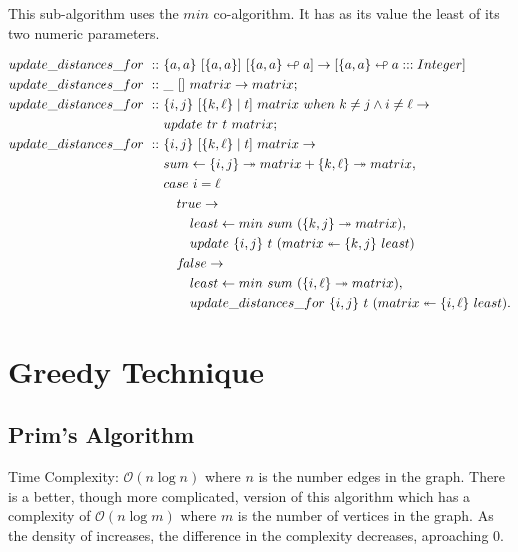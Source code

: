 \documentclass[a4paper,10pt]{book}
\newcommand\when{\  when\ }
\newcommand{\false}{f\kern-0.25ex{alse}}
\begin{document}
This sub-algorithm uses the $min$ co-algorithm. It has as its value the least of its two numeric parameters.

\begin{align*}
update\_distances\_for\ ::\ &\{a,a\}\ [\{a,a\}]\ [\{a,a\}\looparrowleft a]\rightarrow [\{a,a\}\looparrowleft a:::Integer]\\
update\_distances\_for\ ::\ &\_\ []\ matrix\rightarrow matrix;\\
update\_distances\_for\ ::\ &\{i,j\}\ [\{k,\ell\}\mid t]\ matrix\when k \ne j\land i\ne \ell\rightarrow\\
	&update\ tr\ t\ matrix;\\
update\_distances\_for\ ::\ &\{i,j\}\ [\{k,\ell\}\mid t]\ matrix\rightarrow\\
	&sum\leftarrow \{i,j\}\twoheadrightarrow matrix + \{k,\ell\}\twoheadrightarrow matrix,\\
	&case\ i=\ell\\
	&\quad true\rightarrow\\
	&\qquad least\leftarrow min\ sum\ (\{k,j\}\twoheadrightarrow matrix),\\
	&\qquad update\ \{i,j\}\ t\ (matrix\twoheadleftarrow \{k,j\}\ least)\\
	&\quad\false\rightarrow\\
	&\qquad least\leftarrow min\ sum\ (\{i,\ell\}\twoheadrightarrow matrix),\\
	&\qquad update\_distances\_for\ \{i,j\}\ t\ (matrix\twoheadleftarrow \{i,\ell\}\ least).
\end{align*}

\chapter{Greedy Technique}

\section{Prim's Algorithm}
Time Complexity: $\mathcal{O}(n\log n)$ where $n$ is the number edges in the graph. There is a better, though more complicated, version of this algorithm which has a complexity of $\mathcal{O}(n\log m)$ where $m$ is the number of vertices in the graph. As the density of increases, the difference in the complexity decreases, aproaching $0$.
\end{document}
